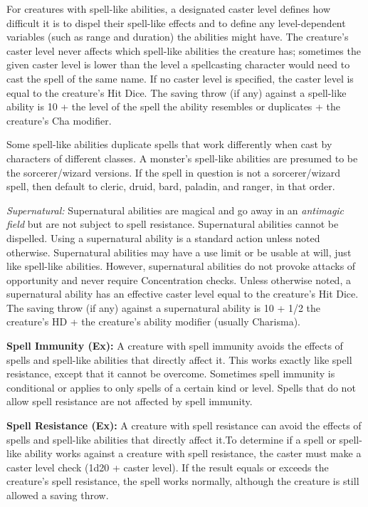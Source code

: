 \documentclass{article}
\begin{document}
For creatures with spell-like abilities, a designated caster level defines how 
difficult it is to dispel their spell-like effects and to define any level-dependent 
variables (such as range and duration) the abilities might have. The creature's 
caster level never affects which spell-like abilities the creature has; sometimes 
the given caster level is lower than the level a spellcasting character would need 
to cast the spell of the same name. If no caster level is specified, the caster 
level is equal to the creature's Hit Dice. The saving throw (if any) against a 
spell-like ability is 10 + the level of the spell the ability resembles or duplicates 
+ the creature's Cha modifier.

Some spell-like abilities duplicate spells that work differently when cast by characters 
of different classes\textit{. }A monster's spell-like abilities are presumed to 
be the sorcerer/wizard versions. If the spell in question is not a sorcerer/wizard 
spell, then default to cleric, druid, bard, paladin, and ranger, in that order.

\textit{Supernatural: }Supernatural abilities are magical and go away in an \textit{antimagic 
field }but are not subject to spell resistance. Supernatural abilities cannot be 
dispelled. Using a supernatural ability is a standard action unless noted otherwise. 
Supernatural abilities may have a use limit or be usable at will, just like spell-like 
abilities. However, supernatural abilities do not provoke attacks of opportunity 
and never require Concentration checks. Unless otherwise noted, a supernatural 
ability has an effective caster level equal to the creature's Hit Dice. The saving 
throw (if any) against a supernatural ability is 10 + 1/2 the creature's HD + the 
creature's ability modifier (usually Charisma).

\vspace{12pt}
\textbf{Spell Immunity (Ex): }A creature with spell immunity avoids the effects 
of spells and spell-like abilities that directly affect it. This works exactly 
like spell resistance, except that it cannot be overcome. Sometimes spell immunity 
is conditional or applies to only spells of a certain kind or level. Spells that 
do not allow spell resistance are not affected by spell immunity.

\vspace{12pt}
\textbf{Spell Resistance (Ex): }A creature with spell resistance can avoid the 
effects of spells and spell-like abilities that directly affect it.To determine 
if a spell or spell-like ability works against a creature with spell resistance, 
the caster must make a caster level check (1d20 + caster level). If the result 
equals or exceeds the creature's spell resistance, the spell works normally, although 
the creature is still allowed a saving throw.
\end{document}
